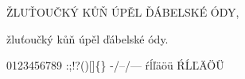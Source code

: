 
ŽLUŤOUČKÝ KŮŇ ÚPĚL ĎÁBELSKÉ ÓDY,

žluťoučký kůň úpěl ďábelské ódy.

0123456789 :;!?()[]\{\} -/--/--- ŕĺľäöü ŔĹĽÄÖÜ 

